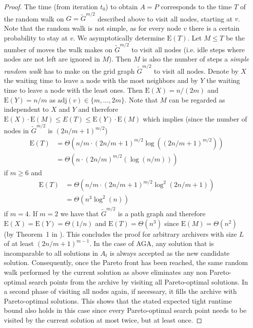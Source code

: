 \documentclass[
sigconf = false, %
review = false, %
screen = true, %
anonymous = true, %
format=acmsmall
]{acmart}
\newcommand*{\E}{\mathrm{E}}
\newcommand{\LO}{\textsc{LO}\xspace}                      %
\newcommand{\TZ}{\textsc{TZ}\xspace}
\begin{document}
\begin{proof}
The time (from iteration $t_0$) to obtain $A=P$ corresponds to the time $T$ of the random walk on $G=\tilde{G}^{m/2}$ described above to visit all nodes, starting at $v$. Note that the random walk is not simple, as for every node $v$ there is a certain probability to stay at $v$. We asymptotically determine $\E(T)$. Let $M \leq T$ be the number of moves the walk makes on $\tilde{G}^{m/2}$ to visit all nodes (i.e. idle steps where nodes are not left are ignored in $M$). Then $M$ is also the number of steps a \emph{simple random walk} has to make on the grid graph $\tilde{G}^{m/2}$ to visit all nodes. Denote by $X$ the waiting time to leave a node with the most neighbors and by $Y$ the waiting time to leave a node with the least ones. Then $\E(X) = n/(2m)$ and $\E(Y) = n/m$ as $\text{adj}(v) \in \{m, \ldots , 2m\}$. Note that $M$ can be regarded as independent to $X$ and $Y$ and therefore $\E(X) \cdot \E(M) \leq E(T) \leq \E(Y) \cdot \E(M)$ which implies (since the number of nodes in $\tilde{G}^{m/2}$ is $(2n/m+1)^{m/2}$) 
\begin{align*}
\E(T) &= \Theta(n/m \cdot (2n/m+1)^{m/2}\log((2n/m+1)^{m/2})) \\
&= \Theta(n \cdot (2n/m)^{m/2}(\log(n/m)))
\end{align*}
if $m \geq 6$ and
\begin{align*}
\E(T) &= \Theta(n/m \cdot (2n/m+1)^{m/2}\log^2(2n/m+1)) \\
&= \Theta(n^3 \log^2(n))
\end{align*}
if $m = 4$. If $m=2$ we have that $\tilde{G}^{m/2}$ is a path graph and therefore $\E(X)=\E(Y)= \Theta(1/n)$ and $\E(T) = \Theta(n^3)$  since $\E(M)=\Theta(n^2)$ (by Theorem~1 in \cite{IKEDA200994}). This concludes the proof for arbitrary archivers with size $L$ of at least $(2n/m+1)^{m-1}$. In the case of AGA, any solution that is incomparable to all solutions in $A_t$ is always accepted as the new candidate solution. Consequently, once the Pareto front has been reached, the same random walk performed by the current solution as above eliminates any non Pareto-optimal search points from the archive by visiting all Pareto-optimal solutions. In a second phase of visiting all nodes again, if necessary, it fills the archive with Pareto-optimal solutions. This shows that the stated expected tight runtime bound also holds in this case since every Pareto-optimal search point needs to be visited by the current solution at most twice, but at least once.
\end{proof}
\end{document}
